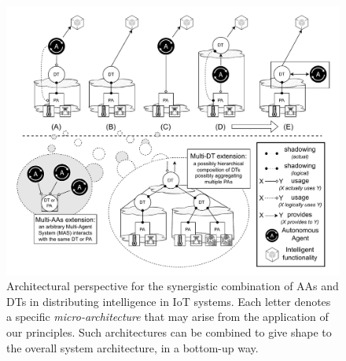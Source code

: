 \begin{figure}
    \centering
    \includegraphics[width=\columnwidth]{figures/dt-mas/2024-toit-si-architecture-aa-dt.pdf}
    \caption{Architectural perspective for the synergistic combination of AAs and DTs in distributing intelligence in IoT systems. Each letter denotes a specific \emph{micro-architecture} that may arise from the application of our principles. Such architectures can be combined to give shape to the overall system architecture, in a bottom-up way.}
    \label{fig:architecture}
\end{figure}


